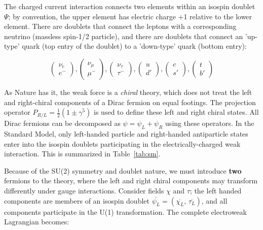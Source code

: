 The charged current interaction connects two elements within an isospin doublet $\Psi$; by convention, the upper element has electric charge +1 relative to the lower element. There are doublets that connect the leptons with a corresponding neutrino (massless spin-1/2 particle), and there are doublets that connect an 'up-type' quark (top entry of the doublet) to a 'down-type' quark (bottom entry):

\begin{equation*}
\begin{pmatrix} \nu_{e} \\ e^{-} \end{pmatrix},
\begin{pmatrix} \nu_{\mu} \\ \mu^{-} \end{pmatrix},
\begin{pmatrix} \nu_{\tau} \\ \tau^{-} \end{pmatrix},
\begin{pmatrix} u \\ d' \end{pmatrix},
\begin{pmatrix} c \\ s' \end{pmatrix},
\begin{pmatrix} t \\ b' \end{pmatrix}
\end{equation*}

As Nature has it, the weak force is a \textit{chiral} theory, which does not treat the left and right-chiral components of a Dirac fermion on equal footings.  The projection operator $P_{R/L} = \frac{1}{2} ( 1 \pm \gamma^{5})$ is used to define these left and right chiral states. All Dirac fermions can be decomposed as $\psi = \psi_{L} + \psi_{R}$ using these operators. In the Standard Model, only left-handed particle and right-handed antiparticle states enter into the isospin doublets participating in the electrically-charged weak interaction. This is summarized in Table~\ref{tab:sm}.

Because of the SU(2) symmetry and doublet nature, we must introduce \textbf{two} fermions to the theory, where the left and right chiral components may transform differently under gauge interactions. Consider fields  $\chi$ and  $\tau$; the left handed components are members of an isospin doublet $\overline{\psi_{L}}=(\overline{\chi_{L}},\,\overline{\tau_{L}})$, and all components participate in the U(1) transformation. The complete electroweak Lagrangian becomes:

